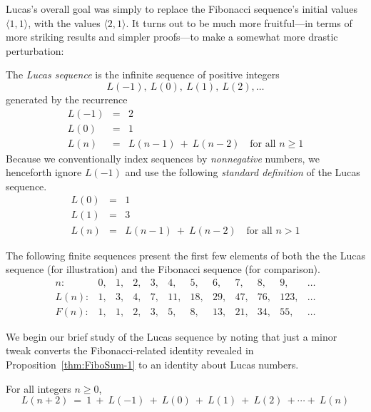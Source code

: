 Lucas's overall goal was simply to replace the Fibonacci sequence's
initial values $\langle 1,1 \rangle$, with the values $\langle 2,1
\rangle$.  It turns out to be much more fruitful---in terms of more
striking results and simpler proofs---to make a somewhat more drastic
perturbation:

The {\it Lucas sequence}  is the
infinite sequence of positive integers
\[ L(-1), \ L(0), \ L(1), \ L(2), \ldots \]
generated by the recurrence
\begin{eqnarray}
\nonumber
L(-1) & = & 2 \\
\label{eq:Lucas-defn-1}
L(0) & = & 1 \\
\nonumber
L(n) & = & L(n-1) \ + \ L(n-2) \ \ \ \mbox{ for all } n \geq 1
\end{eqnarray}
Because we conventionally index sequences by {\em nonnegative}
numbers, we henceforth ignore $L(-1)$ and use the following {\em
  standard definition} of the Lucas sequence.
\begin{eqnarray}
\nonumber
L(0) & = & 1 \\
\label{eq:Lucas-defn-2}
L(1) & = & 3 \\
\nonumber
L(n) & = & L(n-1) \ + \ L(n-2) \ \ \ \mbox{ for all } n > 1
\end{eqnarray}

\medskip

The following finite sequences present the first few elements of both
the the Lucas sequence (for illustration) and the Fibonacci sequence
(for comparison).
\[
\begin{array}{r|rrrrrrrrrrr}
n: &
 0, & 1, & 2, & 3, &  4, &  5, &  6, &  7, &  8, &   9, & \ldots \\
\hline
L(n): &
 1, & 3, & 4, & 7, & 11, & 18, & 29, & 47, & 76, & 123, & \ldots \\
F(n): &
 1, & 1, & 2, & 3, &  5, &  8, & 13, & 21, & 34, &  55, & \ldots
\end{array}
\]

We begin our  brief study of the Lucas sequence by noting that just a
minor tweak converts the Fibonacci-related identity revealed in
Proposition~\ref{thm:FiboSum-1} to an identity about Lucas numbers.

\begin{prop}
\label{thm:LucasSum-1}
For all integers $n \geq 0$,
\begin{equation}
\label{eq:multilinear-Lucas-1}
L(n+2) \ = \
1 \ + \ L(-1) \ + \ L(0) \ + \ L(1) \ + \ L(2) \ + \cdots + \ L(n)
\end{equation}
\end{prop}

